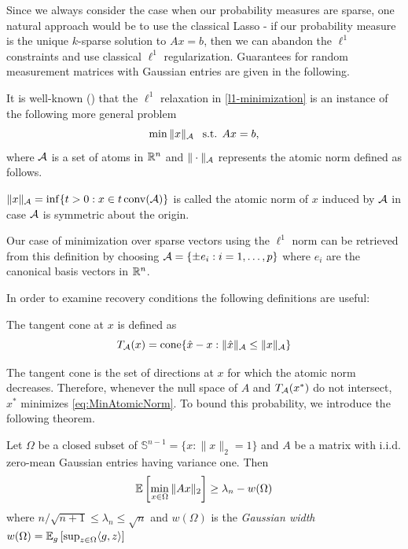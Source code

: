 \documentclass{article} %
\begin{document}
Since we always consider the case when our probability measures are sparse, one natural approach would be to use the classical Lasso - if our probability measure is the unique $k$-sparse solution to $Ax  = b$, then we can abandon the $\ell^1$ constraints and use classical $\ell^1$ regularization. Guarantees for random measurement matrices with Gaussian entries are given in the following.

It is well-known (\cite{inverse_problems}) that the $\ell^1$ relaxation in \eqref{l1-minimization} is an instance of the following more general problem 
\begin{equation}
\label{eq:MinAtomicNorm}
\min \|x\|_{\mathcal{A}} \:\: \text{ s.t. } Ax = b,
\end{equation}
where $\mathcal{A}$ is a set of atoms in $\mathbb{R}^n$ and $\|\cdot \|_{\mathcal{A}}$ represents the atomic norm defined as follows.
\begin{definition}
$\|x\|_{\mathcal{A}} = \inf\{ t>0: x\in t \operatorname{conv}(\mathcal{A})\}$ is called the atomic norm of $x$ induced by $\mathcal{A}$ in case $\mathcal{A}$ is symmetric about the origin.
\end{definition}
Our case of minimization over sparse vectors using the $\ell^1$ norm can be retrieved from this definition by choosing $\mathcal{A} = \{\pm e_i: i = 1,\dots, p\}$ where $e_i$ are the canonical basis vectors in $\mathbb{R}^n$.

In order to examine recovery conditions the following definitions are useful:
\begin{definition}
The tangent cone at $x$ is defined as 
\begin{equation}
\label{eq:TangentCone}
T_{\mathcal{A}}(x) = \operatorname{cone} \{\hat{x} - x: \|\hat{x}\|_{\mathcal{A}} \leq \|x\|_{\mathcal{A}}\}
\end{equation}
\end{definition}
The tangent cone is the set of directions at $x$ for which the atomic norm decreases. Therefore, whenever the null space of $A$ and $T_{\mathcal{A}}(x^*)$ do not intersect, $x^*$ minimizes \eqref{eq:MinAtomicNorm}. To bound this probability, we introduce the following theorem.

\begin{theorem}
\label{thm:ExpectationBound}
Let $\Omega$ be a closed subset of $\mathbb{S}^{n-1} = \{x: \|x\|_2 = 1\}$ and $A$ be a matrix with i.i.d. zero-mean Gaussian entries having variance one. Then
\begin{equation}
  \mathbb{E} \left[ \min_{x\in \Omega} \|A x\|_2 \right] \geq \lambda_n - w(\Omega)
\end{equation} 
where $n/\sqrt{n+1} \leq \lambda_n\leq \sqrt{n}$ and $w(\Omega)$ is the \emph{Gaussian width}
$w(\Omega) = \mathbb{E}_{g} \left[ \sup_{z\in \Omega} \langle g, z\rangle \right]$
\end{theorem}
\end{document}
